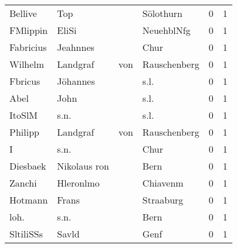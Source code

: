 \begin{tabular}{llllrr}
                  Bellive &                                Top &             &                                   Sölothurn &          0 &         1 \\
                 FMlippin &                              EliSi &             &                                  NeuehblNfg &          0 &         1 \\
                Fabricius &                           Jeahnnes &             &                                        Chur &          0 &         1 \\
                  Wilhelm &                           Landgraf &         von &                                Rauschenberg &          0 &         1 \\
                  Fbricus &                           Jöhannes &             &                                        s.l. &          0 &         1 \\
                     Abel &                               John &             &                                        s.l. &          0 &         1 \\
                   ItoSlM &                               s.n. &             &                                        s.l. &          0 &         1 \\
                  Philipp &                           Landgraf &         von &                                Rauschenberg &          0 &         1 \\
                        I &                               s.n. &             &                                        Chur &          0 &         1 \\
                 Diesbaek &                       Nikolaus ron &             &                                        Bern &          0 &         1 \\
                   Zanchi &                          Hleronlmo &             &                                    Chiavenm &          0 &         1 \\
                  Hotmann &                              Frans &             &                                   Straaburg &          0 &         1 \\
                     loh. &                               s.n. &             &                                        Bern &          0 &         1 \\
                SltiliSSs &                              Savld &             &                                        Genf &          0 &         1 \\

\end{tabular}
